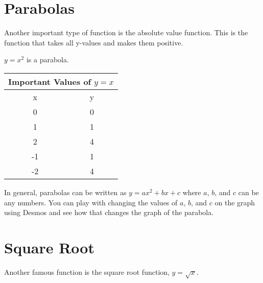 \documentclass{ximera}
\begin{document}
\section{Parabolas}
Another important type of function is the absolute value function.  This is the function that takes all y-values and makes them positive.  

\begin{example}
$y=x^2$ is a parabola.


\begin{tabular}{ |c || c|  }
 \hline
 \multicolumn{2}{|c|}{Important Values of $y=x$} \\
\hline
 \hline
 x & y\\
 \hline
 0&0\\
 1&1\\
 2&4\\
 -1&1\\
 -2&4\\
 \hline
\end{tabular}

\end{example}

In general, parabolas can be written as $y=ax^2+bx+c$ where $a$, $b$, and $c$ can be any numbers.  You can play with changing the values of $a$, $b$, and $c$ on the graph using Desmos and see how that changes the graph of the parabola.  

\begin{center}  
\end{center}




\section{Square Root}
Another famous function is the square root function, $y=\sqrt{x}$.


\end{document}
